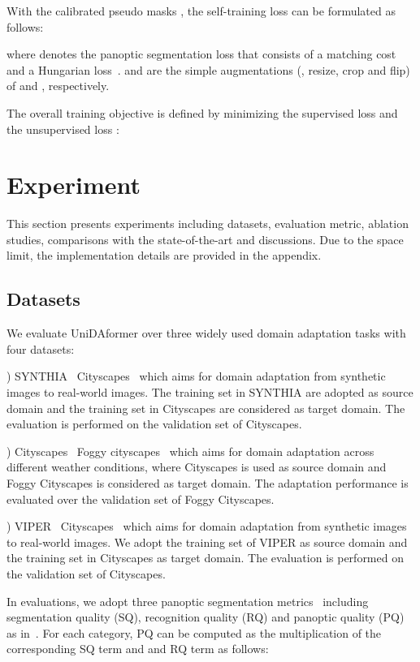 \documentclass[10pt,twocolumn,letterpaper]{article}
\begin{document}
With the calibrated pseudo masks , the self-training loss  can be formulated as follows:

where  denotes the panoptic segmentation loss that consists of a matching cost
and a Hungarian loss~\cite{carion2020detr}.  and  are the simple augmentations (, resize, crop and flip) of  and , respectively.

The overall training objective is defined by minimizing the supervised loss  and the unsupervised loss :




\section{Experiment}
This section presents experiments including datasets, evaluation metric, ablation studies, comparisons with the state-of-the-art and discussions. 
Due to the space limit, the implementation details are provided in the appendix.

\subsection{Datasets}
\label{sec:details}
We evaluate UniDAformer over three widely used domain adaptation tasks with four datasets:

) SYNTHIA~\cite{ros2016synthia}  Cityscapes~\cite{cordts2016cityscapes} which aims for domain adaptation from synthetic images to real-world images. The training set in SYNTHIA are adopted as source domain and the training set in Cityscapes are considered as target domain. The evaluation is performed on the validation set of Cityscapes. 

) Cityscapes~\cite{cordts2016cityscapes}  Foggy cityscapes~\cite{sakaridis2018foggy} which aims for domain adaptation across different weather conditions, where Cityscapes is used as source domain and Foggy Cityscapes is considered as target domain. 
The adaptation performance is evaluated over the validation set of Foggy Cityscapes.


) VIPER~\cite{richter2017viper}  Cityscapes~\cite{cordts2016cityscapes} which aims for domain adaptation from synthetic images to real-world images. We adopt the training set of VIPER as source domain and the training set in Cityscapes as target domain. The evaluation is performed on the validation set of Cityscapes.

In evaluations, we adopt three panoptic segmentation metrics~\cite{kirillov2019panoptic} including segmentation quality (SQ), recognition quality (RQ) and panoptic quality (PQ) as in~\cite{kirillov2019panoptic,kirillov2019panopticfpn,li2021fullypanoptic,huang2021cvrn}. For each category, 
PQ can be computed as the multiplication of the corresponding SQ term and and RQ term as follows:
\end{document}
